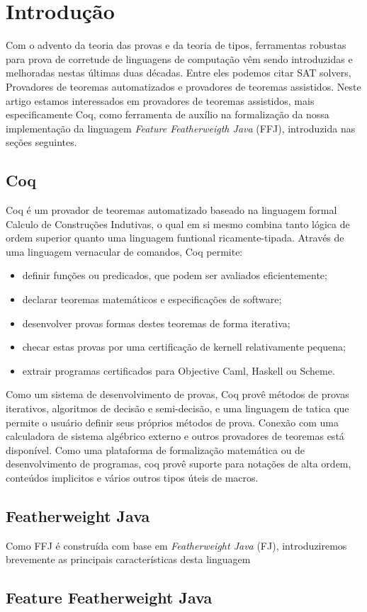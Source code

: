 \chapter{Introdução}
Com o advento da teoria das provas e da teoria de tipos, ferramentas robustas para prova de corretude de linguagens de computação vêm sendo introduzidas e melhoradas nestas últimas duas décadas. Entre eles podemos citar SAT solvers, Provadores de teoremas automatizados e provadores de teoremas assistidos.
Neste artigo estamos interessados em provadores de teoremas assistidos, mais especificamente 
Coq, como ferramenta de auxílio na formalização da nossa implementação da linguagem 
\textit{Feature Featherweigth Java} (FFJ), introduzida nas seções seguintes. 

	\section{Coq}
	Coq é um provador de teoremas automatizado  baseado na linguagem formal Calculo de Construções Indutivas, o qual em si mesmo combina tanto lógica de ordem superior quanto uma linguagem funtional ricamente-tipada. Através de uma linguagem vernacular de comandos, Coq permite:
	\begin{itemize}
		\item definir funções ou predicados, que podem ser avaliados eficientemente;
		\item declarar teoremas matemáticos e especificações de software;
		\item desenvolver provas formas destes teoremas de forma iterativa;
		\item checar estas provas por uma certificação de kernell relativamente pequena;
		\item extrair programas certificados para Objective Caml, Haskell ou Scheme.
	\end{itemize}
	Como um sistema de desenvolvimento de provas, Coq provê métodos de provas iterativos, algoritmos de decisão e semi-decisão, e uma linguagem de tatica que permite o usuário definir seus próprios métodos de prova. Conexão com uma calculadora de sistema algébrico externo e outros provadores de teoremas está disponível.
	Como uma plataforma de formalização matemática ou de desenvolvimento de programas, coq provê suporte para notações de alta ordem, conteúdos implicitos e vários outros tipos úteis de macros.

	\section{Featherweight Java}

	Como FFJ é construída com base em \textit{Featherweight Java} (FJ), introduziremos
brevemente as principais características desta linguagem


	\section{Feature Featherweight Java}
	








